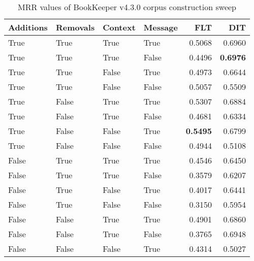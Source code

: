 
\begin{table}
\begin{spacing}{1.2}
\centering
\caption{MRR values of BookKeeper v4.3.0 corpus construction sweep}
\label{table:bookkeeper_corpus_sweep}
\vspace{0.2em}
\begin{tabular}{llll|rr}
\toprule
Additions & Removals & Context & Message & FLT &       DIT \\
\midrule
     True &     True &    True &    True &           0.5068 &       0.6960 \\
     True &     True &    True &   False &           0.4496 & {\bf 0.6976} \\
     True &     True &   False &    True &           0.4973 &       0.6644 \\
     True &     True &   False &   False &           0.5057 &       0.5509 \\
     True &    False &    True &    True &           0.5307 &       0.6884 \\
     True &    False &    True &   False &           0.4681 &       0.6334 \\
     True &    False &   False &    True &     {\bf 0.5495} &       0.6799 \\
     True &    False &   False &   False &           0.4944 &       0.5108 \\
    False &     True &    True &    True &           0.4546 &       0.6450 \\
    False &     True &    True &   False &           0.3579 &       0.6207 \\
    False &     True &   False &    True &           0.4017 &       0.6441 \\
    False &     True &   False &   False &           0.3150 &       0.5954 \\
    False &    False &    True &    True &           0.4901 &       0.6860 \\
    False &    False &    True &   False &           0.3765 &       0.6948 \\
    False &    False &   False &    True &           0.4314 &       0.5027 \\
\bottomrule
\end{tabular}

\end{spacing}
\end{table}
